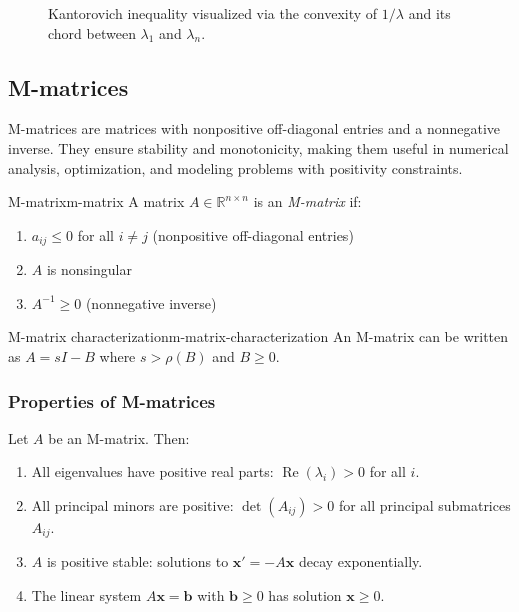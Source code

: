 \begin{figure}[ht]
    \centering
    
    \caption{Kantorovich inequality visualized via the convexity of $1/\lambda$ and its chord between $\lambda_1$ and $\lambda_n$.}
\end{figure}

\subsection{M-matrices}
M-matrices are matrices with nonpositive off-diagonal entries and a nonnegative inverse.
They ensure stability and monotonicity, making them useful in numerical analysis, optimization, and modeling problems with positivity constraints.

\begin{definition}{M-matrix}{m-matrix}
    A matrix $A \in \mathbb{R}^{n \times n}$ is an \emph{M-matrix} if:
    \begin{enumerate}
        \item $a_{ij} \leq 0$ for all $i \neq j$ (nonpositive off-diagonal entries)
        \item $A$ is nonsingular
        \item $A^{-1} \geq 0$ (nonnegative inverse)
    \end{enumerate}
\end{definition}

\begin{corollary}{M-matrix characterization}{m-matrix-characterization}
    An M-matrix can be written as $A = sI - B$ where $s > \rho(B)$ and $B \geq 0$.
\end{corollary}

\subsubsection{Properties of M-matrices}
Let $A$ be an M-matrix. Then:
\begin{enumerate}
    \item All eigenvalues have positive real parts: $\operatorname{Re}(\lambda_i) > 0$ for all $i$.
    \item All principal minors are positive: $\det(A_{ij}) > 0$ for all principal submatrices $A_{ij}$.
    \item $A$ is positive stable: solutions to $\mathbf{x}' = -A\mathbf{x}$ decay exponentially.
    \item The linear system $A\mathbf{x} = \mathbf{b}$ with $\mathbf{b} \geq 0$ has solution $\mathbf{x} \geq 0$.
\end{enumerate}

